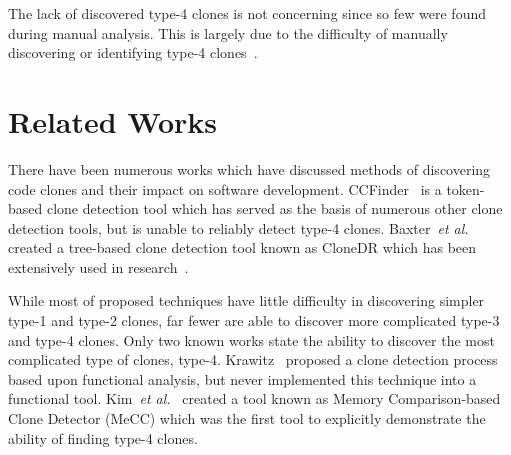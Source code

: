 \documentclass{sig-alternate}
\begin{document}
The lack of discovered type-4 clones is not concerning since so few were found during manual analysis. This is largely due to the difficulty of manually discovering or identifying type-4 clones~\cite{Walenstein:2003:PCT:950792.951349}. 





\section{Related Works}
\label{sec: relatedworks}



There have been numerous works which have discussed methods of discovering code clones and their impact on software development. CCFinder~\cite{Kamiya:2002:CMT:636188.636191} is a token-based clone detection tool which has served as the basis of numerous other clone detection tools, but is unable to reliably detect type-4 clones. Baxter~\emph{et al.} created a tree-based clone detection tool known as CloneDR which has been extensively used in research~\cite{Baxter:1998:CDU:850947.853341}. 

While most of proposed techniques have little difficulty in discovering simpler type-1 and type-2 clones, far fewer are able to discover more complicated type-3 and type-4 clones. Only two known works state the ability to discover the most complicated type of clones, type-4. Krawitz~\cite{Kraw2012} proposed a clone detection process based upon functional analysis, but never implemented this technique into a functional tool. Kim~\emph{et al.}~\cite{Kim:2011:MMC:1985793.1985835} created a tool known as Memory Comparison-based Clone Detector (MeCC) which was the first tool to explicitly demonstrate the ability of finding type-4 clones. 
\end{document}
